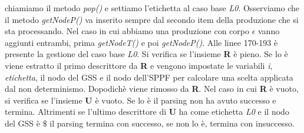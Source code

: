 chiamiamo il metodo \textit{pop()} e settiamo l'etichetta al caso base \textit{L0}. Osserviamo che il metodo \textit{getNodeP()} va inserito sempre dal secondo item della produzione che si sta processando. Nel caso in cui abbiamo una produzione con corpo $\epsilon$ vanno aggiunti entrambi, prima \textit{getNodeT()} e poi \textit{getNodeP()}. Alle linee 170-193 è presente la gestione del caso base \textit{L0}. Si verifica se l'insieme \textbf{R} è pieno. Se lo è viene estratto il primo descrittore da \textbf{R} e vengono impostate le variabili \textit{i}, \textit{etichetta}, il nodo del GSS e il nodo dell'SPPF per calcolare una scelta applicata dal non determinismo. Dopodichè viene rimosso da \textbf{R}. Nel caso in cui \textbf{R} è vuoto, si verifica se l'insieme \textbf{U} è vuoto. Se lo è il parsing non ha avuto successo e termina. Altrimenti se l'ultimo descrittore di \textbf{U} ha come etichetta \textit{L0} e il nodo del GSS è $\$$ il parsing termina con successo, se non lo è, termina con insuccesso.